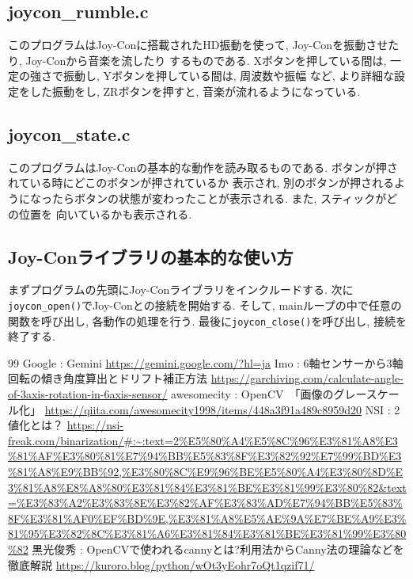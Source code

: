 \documentclass[dvipdfmx]{jsarticle}
\begin{document}
\subsection{joycon\_rumble.c}
%
このプログラムはJoy-Conに搭載されたHD振動を使って, Joy-Conを振動させたり, Joy-Conから音楽を流したり
するものである. Xボタンを押している間は, 一定の強さで振動し, Yボタンを押している間は, 周波数や振幅
など, より詳細な設定をした振動をし, ZRボタンを押すと, 音楽が流れるようになっている.\\
\subsection{joycon\_state.c}
%
このプログラムはJoy-Conの基本的な動作を読み取るものである. ボタンが押されている時にどこのボタンが押されているか
表示され, 別のボタンが押されるようになったらボタンの状態が変わったことが表示される. また, スティックがどの位置を
向いているかも表示される.\\
\subsection{Joy-Conライブラリの基本的な使い方}
%
まずプログラムの先頭にJoy-Conライブラリをインクルードする. 次に\verb+joycon_open()+でJoy-Conとの接続を開始する. 
そして, mainループの中で任意の関数を呼び出し, 各動作の処理を行う. 最後に\verb+joycon_close()+を呼び出し, 接続を
終了する.\\


\begin{thebibliography}{99}
%
 Google : Gemini \url{https://gemini.google.com/?hl=ja}
%
 Imo : 6軸センサーから3軸回転の傾き角度算出とドリフト補正方法 \url{https://garchiving.com/calculate-angle-of-3axis-rotation-in-6axis-sensor/}
%
 awesomecity : OpenCV　「画像のグレースケール化」 \url{https://qiita.com/awesomecity1998/items/448a3f91a489c8959d20}
%
 NSI : 2値化とは？ \url{https://nsi-freak.com/binarization/#:~:text=2%E5%80%A4%E5%8C%96%E3%81%A8%E3%81%AF%E3%80%81%E7%94%BB%E5%83%8F%E3%82%92%E7%99%BD%E3%81%A8%E9%BB%92,%E3%80%8C%E9%96%BE%E5%80%A4%E3%80%8D%E3%81%A8%E8%A8%80%E3%81%84%E3%81%BE%E3%81%99%E3%80%82&text=%E3%83%A2%E3%83%8E%E3%82%AF%E3%83%AD%E7%94%BB%E5%83%8F%E3%81%AF0%EF%BD%9E,%E3%81%A8%E5%AE%9A%E7%BE%A9%E3%81%95%E3%82%8C%E3%81%A6%E3%81%84%E3%81%BE%E3%81%99%E3%80%82}
%
 黒光俊秀 : OpenCVで使われるcannyとは?利用法からCanny法の理論などを徹底解説 \url{https://kuroro.blog/python/wOt3yEohr7oQt1qzif71/}
%
\end{thebibliography}
\end{document}
